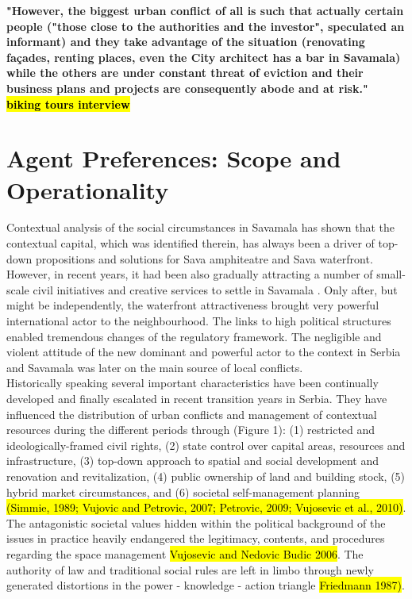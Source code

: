 \documentclass[11pt]{report}
\begin{document}
\textbf{"However, the biggest urban conflict of all is such that actually certain people ("those close to the authorities and the investor", speculated an informant)  and they take advantage of the situation (renovating façades, renting places, even the City architect has a bar in Savamala) while the others are under constant threat of eviction and their business plans and projects are consequently abode and at risk." \hl{biking tours interview}}

\section{Agent Preferences: Scope and Operationality}

Contextual analysis of the social circumstances in Savamala has shown that the contextual capital, which was identified therein, has always been a driver of top-down propositions and solutions for Sava amphiteatre and Sava waterfront.
However, in recent years, it had been also  gradually attracting a number of small-scale civil initiatives and creative services to settle in Savamala \cite{Cvetinovic et al., 2013}.
Only after, but might be independently, the waterfront attractiveness brought very powerful international actor to the neighbourhood.
The links to high political structures enabled tremendous changes of the regulatory framework.
The negligible and violent attitude of the new dominant and powerful actor to the context in Serbia and Savamala was later on the main source of local conflicts. 
\\
Historically speaking several important characteristics have been continually developed and finally escalated in recent transition years in Serbia. They have influenced the distribution of urban conflicts and management of contextual resources during the different periods through (Figure 1): 
(1) restricted and ideologically-framed civil rights, 
(2) state control over capital areas, resources and infrastructure, 
(3) top-down approach to spatial and social development and renovation and revitalization, 
(4) public ownership of land and building stock, 
(5) hybrid market circumstances, and  
(6) societal self-management planning \hl{(Simmie, 1989; Vujovic and Petrovic, 2007; Petrovic, 2009; Vujosevic et al., 2010)}.
The antagonistic societal values hidden within the political background of the issues in practice heavily endangered the legitimacy, contents, and procedures regarding the space management \hl{Vujosevic and Nedovic Budic 2006}.
The authority of law and traditional social rules are left in limbo through newly generated distortions in the power - knowledge - action triangle \hl{Friedmann 1987)}.
\end{document}
